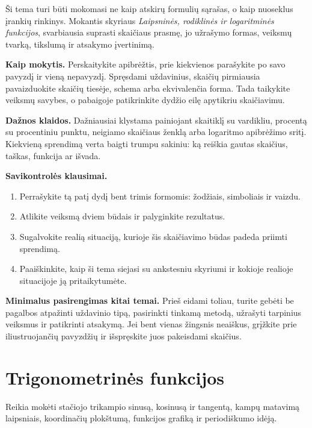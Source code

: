 Ši tema turi būti mokomasi ne kaip atskirų formulių sąrašas, o kaip nuoseklus įrankių rinkinys. Mokantis skyriaus \textit{Laipsninės, rodiklinės ir logaritminės funkcijos}, svarbiausia suprasti skaičiaus prasmę, jo užrašymo formas, veiksmų tvarką, tikslumą ir atsakymo įvertinimą.

\textbf{Kaip mokytis.} Perskaitykite apibrėžtis, prie kiekvienos parašykite po savo pavyzdį ir vieną nepavyzdį. Spręsdami uždavinius, skaičių pirmiausia pavaizduokite skaičių tiesėje, schema arba ekvivalenčia forma. Tada taikykite veiksmų savybes, o pabaigoje patikrinkite dydžio eilę apytikriu skaičiavimu.

\textbf{Dažnos klaidos.} Dažniausiai klystama painiojant skaitiklį su vardikliu, procentą su procentiniu punktu, neigiamo skaičiaus ženklą arba logaritmo apibrėžimo sritį. Kiekvieną sprendimą verta baigti trumpu sakiniu: ką reiškia gautas skaičius, taškas, funkcija ar išvada.

\textbf{Savikontrolės klausimai.}
\begin{enumerate}[label=\arabic*.]
\item Perrašykite tą patį dydį bent trimis formomis: žodžiais, simboliais ir vaizdu.
\item Atlikite veiksmą dviem būdais ir palyginkite rezultatus.
\item Sugalvokite realią situaciją, kurioje šis skaičiavimo būdas padeda priimti sprendimą.
\item Paaiškinkite, kaip ši tema siejasi su ankstesniu skyriumi ir kokioje realioje situacijoje ją pritaikytumėte.
\end{enumerate}

\textbf{Minimalus pasirengimas kitai temai.} Prieš eidami toliau, turite gebėti be pagalbos atpažinti uždavinio tipą, pasirinkti tinkamą metodą, užrašyti tarpinius veiksmus ir patikrinti atsakymą. Jei bent vienas žingsnis neaiškus, grįžkite prie iliustruojančių pavyzdžių ir išspręskite juos pakeisdami skaičius.

\section{Trigonometrinės funkcijos}\label{sec:trigonometrines-funkcijos}

\begin{tcolorbox}[title=Prieš pradedant, colback=green!5]
Reikia mokėti stačiojo trikampio sinusą, kosinusą ir tangentą, kampų matavimą laipsniais, koordinačių plokštumą, funkcijos grafiką ir periodiškumo idėją.
\end{tcolorbox}
